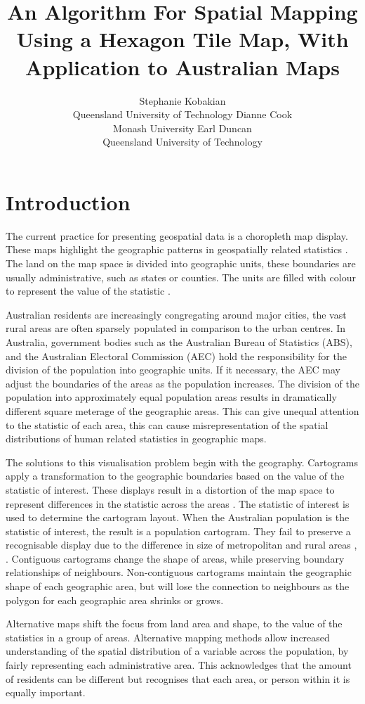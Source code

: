 \documentclass[
]{jss}
\author{
Stephanie Kobakian\\Queensland University of Technology \And Dianne Cook\\Monash University \And Earl Duncan\\Queensland University of Technology
}
\title{An Algorithm For Spatial Mapping Using a Hexagon Tile Map, With
Application to Australian Maps}
\begin{document}
\setcounter{page}{65}

\hypertarget{introduction}{%
\section{Introduction}\label{introduction}}

The current practice for presenting geospatial data is a choropleth map
display. These maps highlight the geographic patterns in geospatially
related statistics \citep{SAMGIS}. The land on the map space is divided
into geographic units, these boundaries are usually administrative, such
as states or counties. The units are filled with colour to represent the
value of the statistic \citep{EI}.

Australian residents are increasingly congregating around major cities,
the vast rural areas are often sparsely populated in comparison to the
urban centres. In Australia, government bodies such as the Australian
Bureau of Statistics (ABS), and the Australian Electoral Commission
(AEC) hold the responsibility for the division of the population into
geographic units. If it necessary, the AEC may adjust the boundaries of
the areas as the population increases. The division of the population
into approximately equal population areas results in dramatically
different square meterage of the geographic areas. This can give unequal
attention to the statistic of each area, this can cause
misrepresentation of the spatial distributions of human related
statistics in geographic maps.

The solutions to this visualisation problem begin with the geography.
Cartograms apply a transformation to the geographic boundaries based on
the value of the statistic of interest. These displays result in a
distortion of the map space to represent differences in the statistic
across the areas \citep{ACCAC}. The statistic of interest is used to
determine the cartogram layout. When the Australian population is the
statistic of interest, the result is a population cartogram. They fail
to preserve a recognisable display due to the difference in size of
metropolitan and rural areas \citep{ACTUC}, \citep{GOINO}. Contiguous
cartograms change the shape of areas, while preserving boundary
relationships of neighbours. Non-contiguous cartograms maintain the
geographic shape of each geographic area, but will lose the connection
to neighbours as the polygon for each geographic area shrinks or grows.

Alternative maps shift the focus from land area and shape, to the value
of the statistics in a group of areas. Alternative mapping methods allow
increased understanding of the spatial distribution of a variable across
the population, by fairly representing each administrative area. This
acknowledges that the amount of residents can be different but
recognises that each area, or person within it is equally important.
\end{document}
